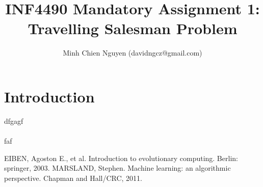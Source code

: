 \documentclass [11pt]{article}
\title{INF4490 Mandatory Assignment 1: \\ Travelling Salesman Problem}
\author{Minh Chien Nguyen (davidngcz@gmail.com)}
\begin{document}
\maketitle
\nocite{*}

\section{Introduction}
dfgagf\\
\\
faf
\begin{thebibliography}{111}
\raggedright
{} EIBEN, Agoston E., et al. Introduction to evolutionary computing. Berlin: springer, 2003.
 MARSLAND, Stephen. Machine learning: an algorithmic perspective. Chapman and Hall/CRC, 2011.

\end{thebibliography}
\end{document}
